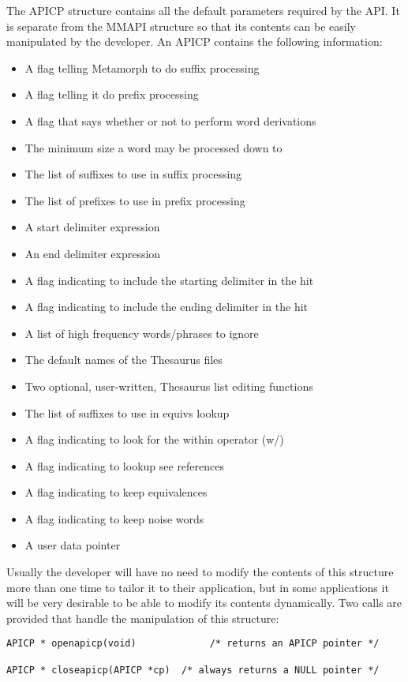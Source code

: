 The APICP structure contains all the default parameters required
by the API.  It is separate from the MMAPI structure so that its
contents can be easily manipulated by the developer.  An APICP
contains the following information:
\begin{itemize}
\item A flag telling Metamorph to do suffix processing
\item A flag telling it do prefix processing
\item A flag that says whether or not to perform word derivations
\item The minimum size a word may be processed down to
\item The list of suffixes to use in suffix processing
\item The list of prefixes to use in prefix processing
\item A start delimiter expression
\item An end delimiter expression
\item A flag indicating to include the starting delimiter in the hit
\item A flag indicating to include the ending delimiter in the hit
\item A list of high frequency words/phrases to ignore
\item The default names of the Thesaurus files
\item Two optional, user-written, Thesaurus list editing functions
\item The list of suffixes to use in equivs lookup
\item A flag indicating to look for the within operator (w/)
\item A flag indicating to lookup see references
\item A flag indicating to keep equivalences
\item A flag indicating to keep noise words
\item A user data pointer
\end{itemize}

Usually the developer will have no need to modify the contents of
this structure more than one time to tailor it to their
application, but in some applications it will be very desirable to
be able to modify its contents dynamically.  Two calls are
provided that handle the manipulation of this structure:


\begin{verbatim}
APICP * openapicp(void)             /* returns an APICP pointer */

APICP * closeapicp(APICP *cp)  /* always returns a NULL pointer */
\end{verbatim}

